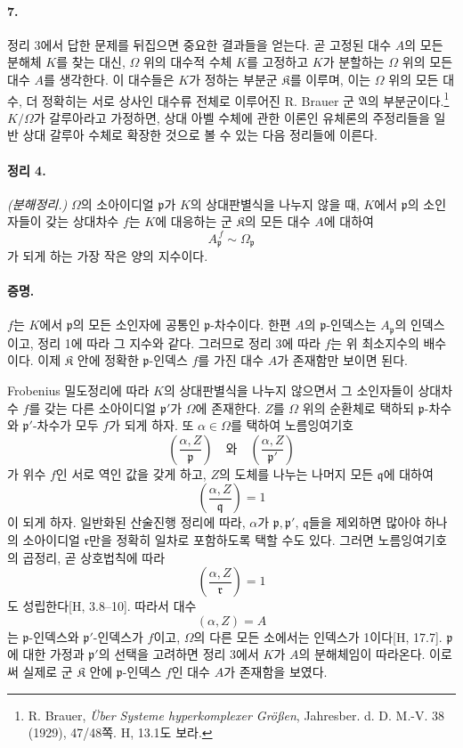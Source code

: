 \paragraph{7.}
정리 3에서 답한 문제를 뒤집으면 중요한 결과들을 얻는다. 곧 고정된 대수 \(A\)의 모든 분해체 \(K\)를 찾는 대신, \(\Omega\) 위의 대수적 수체 \(K\)를 고정하고 \(K\)가 분할하는 \(\Omega\) 위의 모든 대수 \(A\)를 생각한다. 이 대수들은 \(K\)가 정하는 부분군 \(\mathfrak K\)를 이루며, 이는 \(\Omega\) 위의 모든 대수, 더 정확히는 서로 상사인 대수류 전체로 이루어진 R. Brauer 군 \(\mathfrak A\)의 부분군이다.\footnote{R. Brauer, \emph{Über Systeme hyperkomplexer Größen}, Jahresber. d. D. M.-V. 38 (1929), 47/48쪽. H, 13.1도 보라.} \(K/\Omega\)가 갈루아라고 가정하면, 상대 아벨 수체에 관한 이론인 유체론의 주정리들을 일반 상대 갈루아 수체로 확장한 것으로 볼 수 있는 다음 정리들에 이른다.

\paragraph{정리 4.}
\emph{(분해정리.)} \(\Omega\)의 소아이디얼 \(\mathfrak p\)가 \(K\)의 상대판별식을 나누지 않을 때, \(K\)에서 \(\mathfrak p\)의 소인자들이 갖는 상대차수 \(f\)는 \(K\)에 대응하는 군 \(\mathfrak K\)의 모든 대수 \(A\)에 대하여
\[
A_{\mathfrak p}^{\,f}\sim\Omega_{\mathfrak p}
\]
가 되게 하는 가장 작은 양의 지수이다.

\paragraph{증명.}
\(f\)는 \(K\)에서 \(\mathfrak p\)의 모든 소인자에 공통인 \(\mathfrak p\)-차수이다. 한편 \(A\)의 \(\mathfrak p\)-인덱스는 \(A_{\mathfrak p}\)의 인덱스이고, 정리 1에 따라 그 지수와 같다. 그러므로 정리 3에 따라 \(f\)는 위 최소지수의 배수이다. 이제 \(\mathfrak K\) 안에 정확한 \(\mathfrak p\)-인덱스 \(f\)를 가진 대수 \(A\)가 존재함만 보이면 된다.

Frobenius 밀도정리에 따라 \(K\)의 상대판별식을 나누지 않으면서 그 소인자들이 상대차수 \(f\)를 갖는 다른 소아이디얼 \(\mathfrak p'\)가 \(\Omega\)에 존재한다. \(Z\)를 \(\Omega\) 위의 순환체로 택하되 \(\mathfrak p\)-차수와 \(\mathfrak p'\)-차수가 모두 \(f\)가 되게 하자. 또 \(\alpha\in\Omega\)를 택하여 노름잉여기호
\[
\left(\frac{\alpha,Z}{\mathfrak p}\right)
\quad\text{와}\quad
\left(\frac{\alpha,Z}{\mathfrak p'}\right)
\]
가 위수 \(f\)인 서로 역인 값을 갖게 하고, \(Z\)의 도체를 나누는 나머지 모든 \(\mathfrak q\)에 대하여
\[
\left(\frac{\alpha,Z}{\mathfrak q}\right)=1
\]
이 되게 하자. 일반화된 산술진행 정리에 따라, \(\alpha\)가 \(\mathfrak p,\mathfrak p'\), \(\mathfrak q\)들을 제외하면 많아야 하나의 소아이디얼 \(\mathfrak r\)만을 정확히 일차로 포함하도록 택할 수도 있다. 그러면 노름잉여기호의 곱정리, 곧 상호법칙에 따라
\[
\left(\frac{\alpha,Z}{\mathfrak r}\right)=1
\]
도 성립한다[H, 3.8--10]. 따라서 대수
\[
(\alpha,Z)=A
\]
는 \(\mathfrak p\)-인덱스와 \(\mathfrak p'\)-인덱스가 \(f\)이고, \(\Omega\)의 다른 모든 소에서는 인덱스가 1이다[H, 17.7]. \(\mathfrak p\)에 대한 가정과 \(\mathfrak p'\)의 선택을 고려하면 정리 3에서 \(K\)가 \(A\)의 분해체임이 따라온다. 이로써 실제로 군 \(\mathfrak K\) 안에 \(\mathfrak p\)-인덱스 \(f\)인 대수 \(A\)가 존재함을 보였다.

